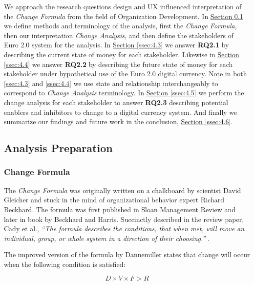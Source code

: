\documentclass[a4paper,12pt]{article} %
\newcommand{\hypersectionref}[1]{\hyperref[#1]{Section \ref{#1}}}
\begin{document}
{We approach the research questions design and UX influenced interpretation of the \textit{Change Formula} from the field of Organization Development\cite{dannemiller1992}. In \hypersectionref{ssec:4.2} we define methods and terminology of the analysis, first the \textit{Change Formula}, then our interpretation \textit{Change Analysis}, and then define the stakeholders of Euro 2.0 system for the analysis. In \hypersectionref{ssec:4.3} we answer \textbf{RQ2.1} by describing the current state of money for each stakeholder. Likewise in \hypersectionref{ssec:4.4} we answer \textbf{RQ2.2} by describing the future state of money for each stakeholder under hypothetical use of the Euro 2.0 digital currency. Note in both \ref{ssec:4.3} and \ref{ssec:4.4} we use state and relationship interchangeably to correspond to \textit{Change Analysis} terminology. In \hypersectionref{ssec:4.5} we perform the change analysis for each stakeholder to answer \textbf{RQ2.3} describing potential enablers and inhibitors to change to a digital currency system. And finally we summarize our findings and future work in the conclusion, \hypersectionref{ssec:4.6}.

\subsection{Analysis Preparation} \label{ssec:4.2}

\subsubsection{Change Formula} \label{sssec:4.2:changeFormula}
The \textit{Change Formula} was originally written on a chalkboard by scientist David Gleicher and stuck in the mind of organizational behavior expert Richard Beckhard\cite{changeFormula2014}. The formula was first published in Sloan Management Review\cite{beckhard1975} and later in book by Beckhard and Harris\cite{organizationalTransitions1977}. Succinctly described in the review paper, Cady et al., \textit{``The formula describes the conditions, that when met, will move an individual, group, or whole system in a direction of their choosing.''} \cite{changeFormula2014}.

The improved version of the formula by Dannemiller\cite{dannemiller1992} states that change will occur when the following condition is satisfied:

\begin{equation}
	D \times V \times F > R
\end{equation}

}
\end{document}
